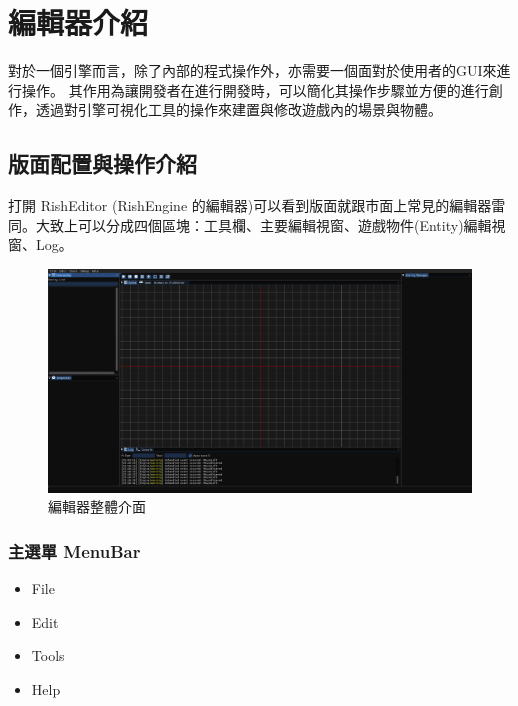 \section{編輯器介紹}

對於一個引擎而言，除了內部的程式操作外，亦需要一個面對於使用者的GUI來進行操作。
其作用為讓開發者在進行開發時，可以簡化其操作步驟並方便的進行創作，透過對引擎可視化工具的操作來建置與修改遊戲內的場景與物體。

\subsection{版面配置與操作介紹}

打開 RishEditor (RishEngine 的編輯器)可以看到版面就跟市面上常見的編輯器雷同。大致上可以分成四個區塊：工具欄、主要編輯視窗、遊戲物件(Entity)編輯視窗、Log。

\begin{figure}[h]
    \begin{center}
    \includegraphics[width=\textwidth]{./resources/editor/all.png}
    \end{center}
\caption{編輯器整體介面}
\label{fig:editor_all}
\end{figure}

\subsubsection{主選單 MenuBar}

\begin{itemize}
\item{File}
\item{Edit}
\item{Tools}
\item{Help}
\end{itemize}

